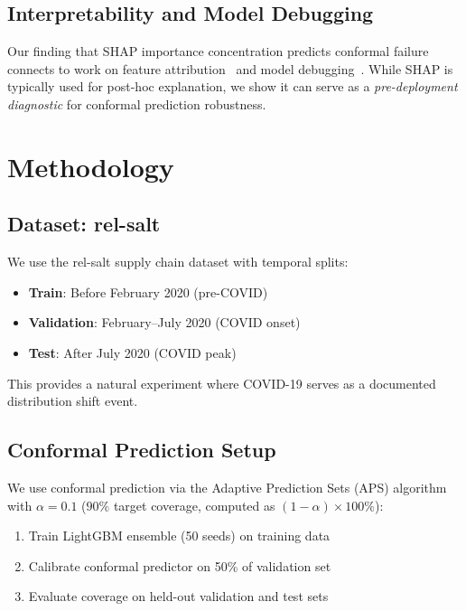 \documentclass[sigconf]{acmart}
\begin{document}
\subsection{Interpretability and Model Debugging}

Our finding that SHAP importance concentration predicts conformal failure
connects to work on feature attribution~\cite{lundberg2017unified} and model
debugging~\cite{adebayo2018sanity}. While SHAP is typically used for
post-hoc explanation, we show it can serve as a \textit{pre-deployment diagnostic}
for conformal prediction robustness.

\section{Methodology}

\subsection{Dataset: rel-salt}

We use the rel-salt supply chain dataset with temporal splits:
\begin{itemize}
    \item \textbf{Train}: Before February 2020 (pre-COVID)
    \item \textbf{Validation}: February--July 2020 (COVID onset)
    \item \textbf{Test}: After July 2020 (COVID peak)
\end{itemize}

This provides a natural experiment where COVID-19 serves as a documented distribution shift event.

\subsection{Conformal Prediction Setup}

We use conformal prediction via the Adaptive Prediction Sets (APS) algorithm~\cite{romano2020classification} with $\alpha = 0.1$ ($90\%$ target coverage, computed as $(1-\alpha) \times 100\%$):
\begin{enumerate}
    \item Train LightGBM ensemble (50 seeds) on training data
    \item Calibrate conformal predictor on 50\% of validation set
    \item Evaluate coverage on held-out validation and test sets
\end{enumerate}
\end{document}
